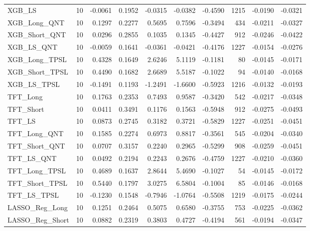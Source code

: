 \begin{tabular}{llrrrrrrrr}
\cline{1-10}
XGB\_LS & 10 & -0.0061 & 0.1952 & -0.0315 & -0.0382 & -0.4590 & 1215 & -0.0190 & -0.0321 \\
\cline{1-10}
XGB\_Long\_QNT & 10 & 0.1297 & 0.2277 & 0.5695 & 0.7596 & -0.3494 & 434 & -0.0211 & -0.0327 \\
\cline{1-10}
XGB\_Short\_QNT & 10 & 0.0296 & 0.2855 & 0.1035 & 0.1345 & -0.4427 & 912 & -0.0246 & -0.0422 \\
\cline{1-10}
XGB\_LS\_QNT & 10 & -0.0059 & 0.1641 & -0.0361 & -0.0421 & -0.4176 & 1227 & -0.0154 & -0.0276 \\
\cline{1-10}
XGB\_Long\_TPSL & 10 & 0.4328 & 0.1649 & 2.6246 & 5.1119 & -0.1181 & 80 & -0.0145 & -0.0171 \\
\cline{1-10}
XGB\_Short\_TPSL & 10 & 0.4490 & 0.1682 & 2.6689 & 5.5187 & -0.1022 & 94 & -0.0140 & -0.0168 \\
\cline{1-10}
XGB\_LS\_TPSL & 10 & -0.1491 & 0.1193 & -1.2491 & -1.6600 & -0.5923 & 1216 & -0.0132 & -0.0193 \\
\cline{1-10}
TFT\_Long & 10 & 0.1763 & 0.2353 & 0.7493 & 0.9587 & -0.3420 & 542 & -0.0217 & -0.0348 \\
\cline{1-10}
TFT\_Short & 10 & 0.0411 & 0.3491 & 0.1176 & 0.1563 & -0.5948 & 912 & -0.0275 & -0.0493 \\
\cline{1-10}
TFT\_LS & 10 & 0.0873 & 0.2745 & 0.3182 & 0.3721 & -0.5829 & 1227 & -0.0251 & -0.0451 \\
\cline{1-10}
TFT\_Long\_QNT & 10 & 0.1585 & 0.2274 & 0.6973 & 0.8817 & -0.3561 & 545 & -0.0204 & -0.0340 \\
\cline{1-10}
TFT\_Short\_QNT & 10 & 0.0707 & 0.3157 & 0.2240 & 0.2965 & -0.5299 & 908 & -0.0259 & -0.0451 \\
\cline{1-10}
TFT\_LS\_QNT & 10 & 0.0492 & 0.2194 & 0.2243 & 0.2676 & -0.4759 & 1227 & -0.0210 & -0.0360 \\
\cline{1-10}
TFT\_Long\_TPSL & 10 & 0.4689 & 0.1637 & 2.8644 & 5.4690 & -0.1027 & 54 & -0.0145 & -0.0172 \\
\cline{1-10}
TFT\_Short\_TPSL & 10 & 0.5440 & 0.1797 & 3.0275 & 6.5804 & -0.1004 & 85 & -0.0146 & -0.0168 \\
\cline{1-10}
TFT\_LS\_TPSL & 10 & -0.1230 & 0.1548 & -0.7946 & -1.0764 & -0.5508 & 1219 & -0.0175 & -0.0244 \\
\cline{1-10}
LASSO\_Reg\_Long & 10 & 0.1251 & 0.2464 & 0.5075 & 0.6580 & -0.3755 & 753 & -0.0225 & -0.0362 \\
\cline{1-10}
LASSO\_Reg\_Short & 10 & 0.0882 & 0.2319 & 0.3803 & 0.4727 & -0.4194 & 561 & -0.0194 & -0.0347 \\

\end{tabular}
